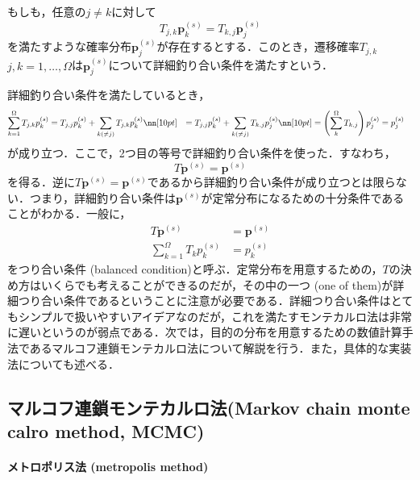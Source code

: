 \begin{kotak}
	\begin{definition}
	もしも，任意の$j\neq k$に対して
	\begin{equation}
	    T_{j,k}\bm{p}^{(s)}_k = T_{k,j}\bm{p}^{(s)}_j
	\end{equation}
	を満たすような確率分布$\bm{p}^{(s)}_j$が存在するとする．このとき，遷移確率$T_{j,k}$ $j,k=1,\ldots,\Omega$は$\bm{p}^{(s)}_j$について詳細釣り合い条件を満たすという．
	\end{definition}
\end{kotak}

詳細釣り合い条件を満たしているとき，
\begin{align}
    \sum_{k=1}^{\Omega} T_{j,k}p_k^{(s)}
    &=T_{j,j}p_k^{(s)} + \sum_{k(\neq j)} T_{j,k}p_k^{(s)}\nn[10pt]
    &=T_{j,j}p_k^{(s)} + \sum_{k(\neq j)} T_{k,j}p_j^{(s)}\nn[10pt]
    &=\left(\sum_{k}^{\Omega} T_{k,j}\right)p_j^{(s)}=p_j^{(s)}
\end{align}
が成り立つ．ここで，2つ目の等号で詳細釣り合い条件を使った．すなわち，
\begin{equation}
    T\bm{p}^{(s)}=\bm{p}^{(s)}
\end{equation}
を得る．逆に$T\bm{p}^{(s)}=\bm{p}^{(s)}$であるから詳細釣り合い条件が成り立つとは限らない．つまり，詳細釣り合い条件は$\bm{p}^{(s)}$が定常分布になるための十分条件であることがわかる．一般に，
\begin{align}
    T\bm{p}^{(s)}&=\bm{p}^{(s)}\\[10pt]
    \sum_{k=1}^{\Omega}T_{k}p^{(s)}_k&=p^{(s)}_k
\end{align}
をつり合い条件 (balanced condition)と呼ぶ．定常分布を用意するための，$T$の決め方はいくらでも考えることができるのだが，その中の一つ (one of them)が詳細つり合い条件であるということに注意が必要である．詳細つり合い条件はとてもシンプルで扱いやすいアイデアなのだが，これを満たすモンテカルロ法は非常に遅いというのが弱点である．次では，目的の分布を用意するための数値計算手法であるマルコフ連鎖モンテカルロ法について解説を行う．また，具体的な実装法についても述べる．



\subsection{マルコフ連鎖モンテカルロ法(Markov chain monte calro method, MCMC)}
\paragraph{メトロポリス法 (metropolis method)}



